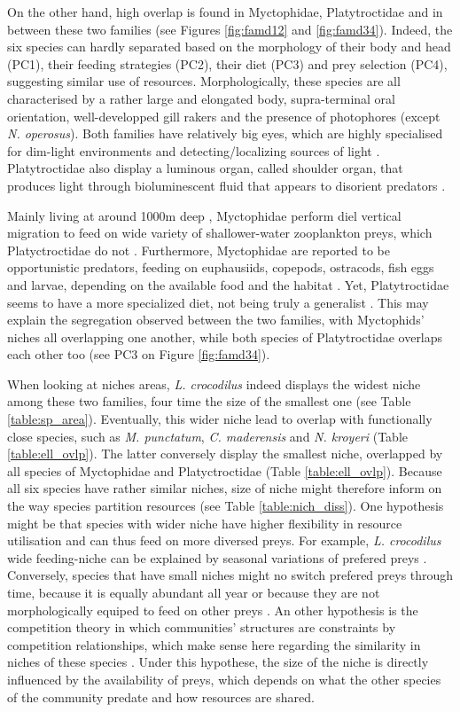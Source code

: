 On the other hand, high overlap is found in Myctophidae, Platytroctidae and in between these two families (see Figures \ref{fig:famd12} and \ref{fig:famd34}). Indeed, the six species can hardly separated based on the morphology of their body and head (PC1), their feeding strategies (PC2), their diet (PC3) and prey selection (PC4), suggesting similar use of resources. Morphologically, these species are all characterised by a rather large and elongated body, supra-terminal oral orientation, well-developped gill rakers and the presence of photophores (except \textit{N. operosus}). Both families have relatively big eyes, which are highly specialised for dim-light environments and detecting/localizing sources of light \citep{debusserolles2014,novotny2018}. Platytroctidae also display a luminous organ, called shoulder organ, that produces light through bioluminescent fluid that appears to disorient predators \citep{novotny2018}. 

Mainly living at around 1000m deep \citep{froese2019}, Myctophidae perform diel vertical migration to feed on wide variety of shallower-water zooplankton preys, which Platyctroctidae do not \citep{sutton2013a}. Furthermore, Myctophidae are reported to be opportunistic predators, feeding on euphausiids, copepods, ostracods, fish eggs and larvae, depending on the available food and the habitat \citet{catul2011,kozlov1995}. Yet, Platytroctidae seems to have a more specialized diet, not being truly a generalist \citet{novotny2018}. This may explain the segregation observed between the two families, with Myctophids' niches all overlapping one another, while both species of Platytroctidae overlaps each other too (see PC3 on Figure \ref{fig:famd34}).

When looking at niches areas, \textit{L. crocodilus} indeed displays the widest niche among these two families, four time the size of the smallest one (see Table \ref{table:sp_area}). Eventually, this wider niche lead to overlap with functionally close species, such as \textit{M. punctatum}, \textit{C. maderensis} and \textit{N. kroyeri} (Table \ref{table:ell_ovlp}). The latter conversely display the smallest niche, overlapped by all species of Myctophidae and Platyctroctidae (Table \ref{table:ell_ovlp}). Because all six species have rather similar niches, size of niche might therefore inform on the way species partition resources (see Table \ref{table:nich_diss}). One hypothesis might be that species with wider niche have higher flexibility in resource utilisation and can thus feed on more diversed preys. For example, \textit{L. crocodilus} wide feeding-niche can be explained by seasonal variations of prefered preys \citet{fanelli2014}. Conversely, species that have small niches might no switch prefered preys through time, because it is equally abundant all year or because they are not morphologically equiped to feed on other preys \citep{mejri2009}. An other hypothesis is the competition theory in which communities' structures are constraints by competition relationships, which make sense here regarding the similarity in niches of these species \citep{geange2011}. Under this hypothese, the size of the niche is directly influenced by the availability of preys, which depends on what the other species of the community predate and how resources are shared.

